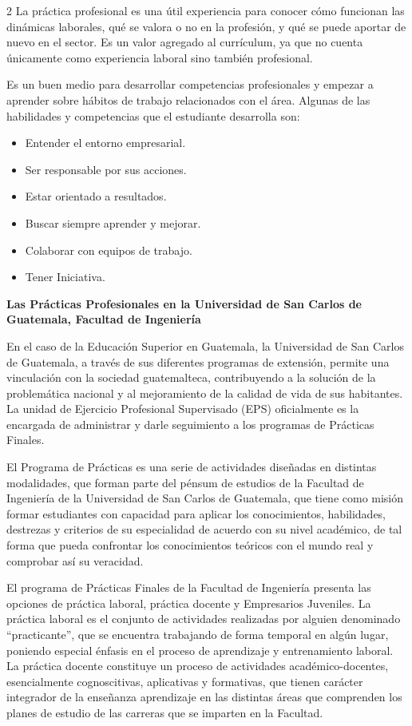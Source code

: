\documentclass[12pt,spanish,Letterpaper,openany]{book}
\providecommand{\tightlist}{%
  \setlength{\itemsep}{0pt}\setlength{\parskip}{0pt}}
\begin{document}
\begin {multicols}{2}
La práctica profesional es una útil experiencia para conocer cómo funcionan las dinámicas laborales, qué se valora o no en la profesión, y qué se puede aportar de nuevo en el sector. Es un valor agregado al currículum, ya que no cuenta únicamente como experiencia laboral sino también profesional.

Es un buen medio para desarrollar competencias profesionales y empezar a aprender sobre hábitos de trabajo relacionados con el área. Algunas de las habilidades y competencias que el estudiante desarrolla son:

\begin{itemize}
\tightlist
\item
  Entender el entorno empresarial.
\item
  Ser responsable por sus acciones.
\item
  Estar orientado a resultados.
\item
  Buscar siempre aprender y mejorar.
\item
  Colaborar con equipos de trabajo.
\item
  Tener Iniciativa.
\end{itemize}

\textbf{Las Prácticas Profesionales en la Universidad de San Carlos de Guatemala, Facultad de Ingeniería}

En el caso de la Educación Superior en Guatemala, la Universidad de San Carlos de Guatemala, a través de sus diferentes programas de extensión, permite una vinculación con la sociedad guatemalteca, contribuyendo a la solución de la problemática nacional y al mejoramiento de la calidad de vida de sus habitantes. La unidad de Ejercicio Profesional Supervisado (EPS) oficialmente es la encargada de administrar y darle seguimiento a los programas de Prácticas Finales.

El Programa de Prácticas es una serie de actividades diseñadas en distintas modalidades, que forman parte del pénsum de estudios de la Facultad de Ingeniería de la Universidad de San Carlos de Guatemala, que tiene como misión formar estudiantes con capacidad para aplicar los conocimientos, habilidades, destrezas y criterios de su especialidad de acuerdo con su nivel académico, de tal forma que pueda confrontar los conocimientos teóricos con el mundo real y comprobar así su veracidad.

El programa de Prácticas Finales de la Facultad de Ingeniería presenta las opciones de práctica laboral, práctica docente y Empresarios Juveniles.
La práctica laboral es el conjunto de actividades realizadas por alguien denominado ``practicante'', que se encuentra trabajando de forma temporal en algún lugar, poniendo especial énfasis en el proceso de aprendizaje y entrenamiento laboral.
La práctica docente constituye un proceso de actividades académico-docentes, esencialmente cognoscitivas, aplicativas y formativas, que tienen carácter integrador de la enseñanza aprendizaje en las distintas áreas que comprenden los planes de estudio de las carreras que se imparten en la Facultad.


\end{multicols}
\end{document}
